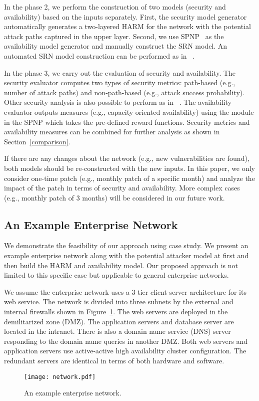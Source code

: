 \documentclass[conference]{IEEEtran}
\begin{document}
In the phase 2, we perform the construction of two models (security and availability) based on the inputs separately. First, the security model generator automatically generates a two-layered HARM for the network with the potential attack paths captured in the upper layer. Second, we use SPNP~\cite{Ciardo1989SPNP} as the availability model generator and manually construct the SRN model. An automated SRN model construction can be performed as in ~\cite{Machida2011Candy}. 

In the phase 3, we carry out the evaluation of security and availability. The security evaluator computes two types of security metrics: path-based (e.g., number of attack paths) and non-path-based (e.g., attack success probability). Other security analysis is also possible to perform as in ~\cite{Ge2017JNCA}. The availability evaluator outputs measures (e.g., capacity oriented availability) using the module in the SPNP which takes the pre-defined reward functions. Security metrics and availability measures can be combined for further analysis as shown in Section~\ref{comparison}.

If there are any changes about the network (e.g., new vulnerabilities are found), both models should be re-constructed with the new inputs. In this paper, we only consider one-time patch (e.g., monthly patch of a specific month) and analyze the impact of the patch in terms of security and availability. More complex cases (e.g., monthly patch of 3 months) will be considered in our future work. 

\subsection{An Example Enterprise Network}
\label{net}
We demonstrate the feasibility of our approach using case study. We present an example enterprise network along with the potential attacker model at first and then build the HARM and availability model. Our proposed approach is not limited to this specific case but applicable to general enterprise networks.

We assume the enterprise network uses a 3-tier client-server architecture for its web service. The network is divided into three subnets by the external and internal firewalls shown in Figure~\ref{fig_net}. The web servers are deployed in the demilitarized zone (DMZ). The application servers and database server are located in the intranet. There is also a domain name service (DNS) server responding to the domain name queries in another DMZ. Both web servers and application servers use active-active high availability cluster configuration. The redundant servers are identical in terms of both hardware and software.
\begin{figure}[htb]
\centering
\texttt{[image: network.pdf]}
\caption{An example enterprise network.}
\label{fig_net}
\end{figure}
\end{document}
